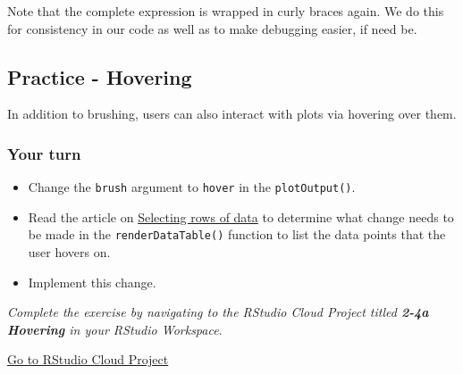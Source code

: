 \documentclass[
  letterpaper,
  DIV=11,
  numbers=noendperiod]{scrreprt}
\providecommand{\tightlist}{%
  \setlength{\itemsep}{0pt}\setlength{\parskip}{0pt}}
\begin{document}
Note that the complete expression is wrapped in curly braces again. We
do this for consistency in our code as well as to make debugging easier,
if need be.

\hypertarget{practice---hovering}{%
\subsection{Practice - Hovering}\label{practice---hovering}}

In addition to brushing, users can also interact with plots via hovering
over them.

\hypertarget{your-turn-12}{%
\subsubsection{Your turn}\label{your-turn-12}}

\begin{itemize}
\tightlist
\item
  Change the \texttt{brush} argument to \texttt{hover} in the
  \texttt{plotOutput()}.
\item
  Read the article on
  \href{http://shiny.rstudio.com/articles/selecting-rows-of-data.html}{Selecting
  rows of data} to determine what change needs to be made in the
  \texttt{renderDataTable()} function to list the data points that the
  user hovers on.
\item
  Implement this change.
\end{itemize}

\emph{Complete the exercise by navigating to the RStudio Cloud Project
titled \textbf{2-4a Hovering} in your RStudio Workspace}.

\href{https://rstudio.cloud/spaces/81721/join?access_code=I4VJaNsKfTqR3Td9hLP7E1nz8\%2FtMg6Xbw9Bgqumv}{
Go to RStudio Cloud Project}
\end{document}
